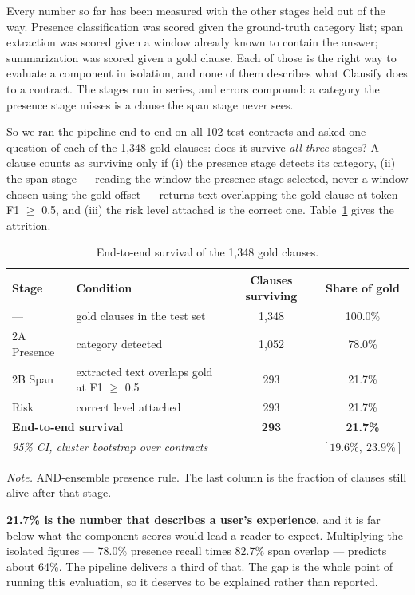 Every number so far has been measured with the other stages held out of the way. Presence classification was scored given the ground-truth category list; span extraction was scored given a window already known to contain the answer; summarization was scored given a gold clause. Each of those is the right way to evaluate a component in isolation, and none of them describes what Clausify does to a contract. The stages run in series, and errors compound: a category the presence stage misses is a clause the span stage never sees.

So we ran the pipeline end to end on all 102 test contracts and asked one question of each of the 1{,}348 gold clauses: does it survive \emph{all three} stages? A clause counts as surviving only if (i) the presence stage detects its category, (ii) the span stage --- reading the window the presence stage selected, never a window chosen using the gold offset --- returns text overlapping the gold clause at token-F1 $\geq$ 0.5, and (iii) the risk level attached is the correct one. Table~\ref{tab:e2e} gives the attrition.

\begin{table}[ht]
\centering
\caption{End-to-end survival of the 1{,}348 gold clauses.}
\label{tab:e2e}
\small
\begin{tabular}{llcc}
\toprule
\textbf{Stage} & \textbf{Condition} & \textbf{Clauses surviving} & \textbf{Share of gold}\\
\midrule
--- & gold clauses in the test set & 1{,}348 & 100.0\%\\
2A Presence & category detected & 1{,}052 & 78.0\%\\
2B Span & extracted text overlaps gold at F1 $\geq$ 0.5 & 293 & 21.7\%\\
Risk & correct level attached & 293 & 21.7\%\\
\midrule
\multicolumn{2}{l}{\textbf{End-to-end survival}} & \textbf{293} & \textbf{21.7\%}\\
\multicolumn{2}{l}{\emph{95\% CI, cluster bootstrap over contracts}} & & $[19.6\%,\ 23.9\%]$\\
\bottomrule
\end{tabular}

{\footnotesize\singlespacing \emph{Note.} AND-ensemble presence rule. The last column is the fraction of clauses still alive after that stage.\par}
\end{table}

\textbf{21.7\% is the number that describes a user's experience}, and it is far below what the component scores would lead a reader to expect. Multiplying the isolated figures --- 78.0\% presence recall times 82.7\% span overlap --- predicts about 64\%. The pipeline delivers a third of that. The gap is the whole point of running this evaluation, so it deserves to be explained rather than reported.

